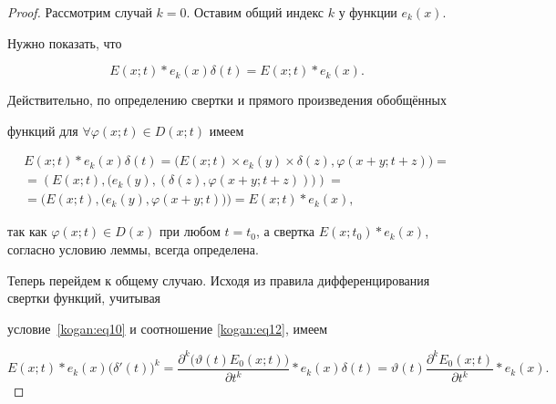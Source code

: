 \begin{proof}

Рассмотрим случай $k=0$. Оставим общий индекс $k$ у функции $e_k(x)$. 

Нужно показать, что

\begin{equation}

\label{kogan:eq12}

E(x;t) \ast e_k (x)\delta (t)=E(x;t) \ast e_k (x).

\end{equation}



Действительно, по определению свертки и прямого произведения обобщённых 

функций для $\forall \varphi (x;t)\in D(x;t)$ имеем

\begin{multline*}

E(x;t) \ast e_k (x) \delta (t)=\big(E(x;t)\times e_k (y)\times \delta (z),\varphi (x+y;t+z) \big)=\\

=\left(E(x;t),\big(e_k (y),(\delta (z),\varphi (x+y;t+z))\big) \right)=\\

=\big(E(x;t), \big(e_k (y),\varphi  (x+y;t)\big) \big)=E(x;t)\ast e_k (x),

\end{multline*}

так как $\varphi (x;t)\in D(x)$ при любом $t=t_0$, а свертка $E(x;t_0 )\ast 

e_k (x)$, согласно условию леммы, всегда определена. 



Теперь перейдем к  общему случаю. Исходя из правила дифференцирования свертки функций, учитывая 

условие~\eqref{kogan:eq10} и соотношение \eqref{kogan:eq12}, имеем

\[

E(x;t)\ast e_k (x)\big(\delta'(t) \big)^k=\frac{\partial ^k\big(\vartheta (t)E_0 (x;t) \big)}{\partial t^k}\ast e_k (x)\delta (t)=\vartheta (t)\frac{\partial 

^k E_0 (x;t)}{\partial t^k}\ast e_k (x).

\]



\hfill

\end{proof}



